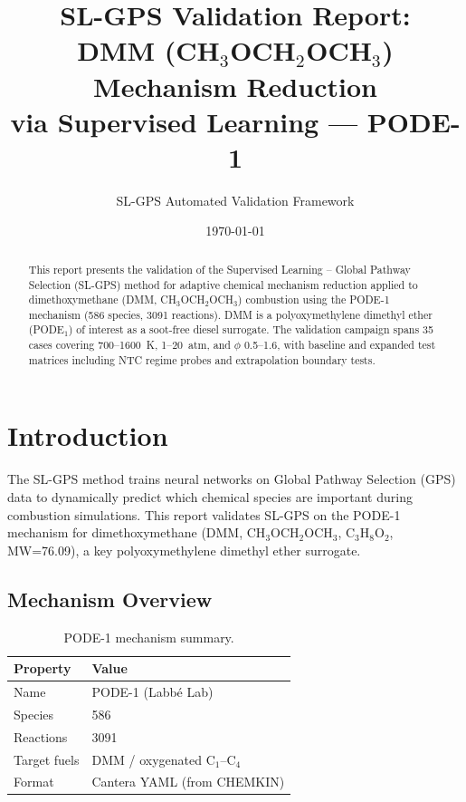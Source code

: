 \documentclass[11pt,a4paper]{article}
\title{SL-GPS Validation Report:\\DMM (CH$_3$OCH$_2$OCH$_3$) Mechanism Reduction\\via Supervised Learning --- PODE-1}
\author{SL-GPS Automated Validation Framework}
\date{\today}
\begin{document}
\maketitle

\begin{abstract}
This report presents the validation of the Supervised Learning -- Global Pathway Selection (SL-GPS) method for adaptive chemical mechanism reduction applied to dimethoxymethane (DMM, CH$_3$OCH$_2$OCH$_3$) combustion using the PODE-1 mechanism (586 species, 3091 reactions). DMM is a polyoxymethylene dimethyl ether (PODE$_1$) of interest as a soot-free diesel surrogate. The validation campaign spans 35 cases covering 700--1600~K, 1--20~atm, and $\phi$ 0.5--1.6, with baseline and expanded test matrices including NTC regime probes and extrapolation boundary tests.
\end{abstract}

\tableofcontents
\newpage

\section{Introduction}

The SL-GPS method trains neural networks on Global Pathway Selection (GPS) data to dynamically predict which chemical species are important during combustion simulations. This report validates SL-GPS on the PODE-1 mechanism for dimethoxymethane (DMM, CH$_3$OCH$_2$OCH$_3$, C$_3$H$_8$O$_2$, MW=76.09), a key polyoxymethylene dimethyl ether surrogate.

\subsection{Mechanism Overview}

\begin{table}[H]
\centering
\caption{PODE-1 mechanism summary.}
\label{tab:mech}
\begin{tabular}{ll}
\toprule
\textbf{Property} & \textbf{Value} \\
\midrule
Name & PODE-1 (Labb\'{e} Lab) \\
Species & 586 \\
Reactions & 3091 \\
Target fuels & DMM / oxygenated C$_1$--C$_4$ \\
Format & Cantera YAML (from CHEMKIN) \\
\bottomrule
\end{tabular}
\end{table}
\end{document}
